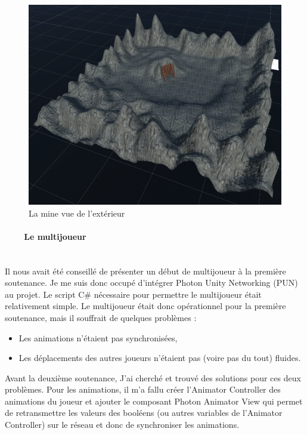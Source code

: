 \documentclass[titlepage, 13px, a4paper]{report}
\begin{document}
\begin{figure}[h!]
  \centering
  \includegraphics[scale=0.3]{images/cedric_mine.png}
  \caption{La mine vue de l'extérieur}
\end{figure}

\paragraph{~~~~Le multijoueur} \hspace{0pt} \\
Il nous avait été conseillé de présenter un début de multijoueur à la première soutenance. 
Je me suis donc occupé d’intégrer Photon Unity Networking (PUN) au projet.
Le script C\# nécessaire pour permettre le multijoueur était relativement simple.
Le multijoueur était donc opérationnel pour la première soutenance, mais il souffrait de quelques problèmes : \\
{\begin{itemize}
	 \item Les animations n’étaient pas synchronisées,
	 \item Les déplacements des autres joueurs n’étaient pas (voire pas du tout) fluides. \\
\end{itemize}}

Avant la deuxième soutenance, J'ai cherché et trouvé des solutions pour ces deux problèmes.
Pour les animations, il m’a fallu créer l’Animator Controller des animations du joueur et ajouter 
le composant Photon Animator View qui permet de retransmettre les valeurs des booléens (ou autres variables 
de l’Animator Controller) sur le réseau et donc de synchroniser les animations. \\
\end{document}
